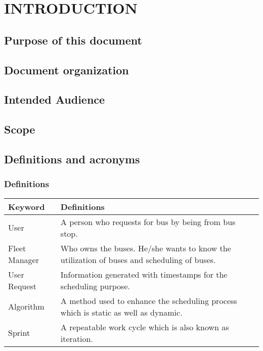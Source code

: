 \section{INTRODUCTION}
\subsection{Purpose of this document}
\subsection{Document organization} 
\subsection{Intended Audience} 
\subsection{Scope} 
\subsection{Definitions and acronyms}
\subsubsection{Definitions} 
\begin{center}
	\begin{tabular} { | m{3cm} | m{10cm} | }
		\hline
		\textbf{Keyword} & \textbf{Definitions}\\
		\hline
		User & A person who requests for bus by being from bus stop.\\
		\hline
		Fleet Manager & Who owns the buses. He/she wants to know the utilization of buses and scheduling of buses.\\
		\hline
		User Request & Information generated with timestamps for the scheduling purpose.\\
		\hline
		Algorithm & A method used to enhance the scheduling process which is static as well as dynamic.\\
		\hline
		Sprint & A repeatable work cycle which is also known as iteration.\\
		\hline
	\end{tabular}
\end{center}
